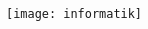 
\thispagestyle{empty}

\begin{addmargin}[-0.5cm]{0cm}
\centering
  \large

  \hfill

  \vspace{30mm}

  \oTUM{4cm}\\
  \vspace{10mm}
  \spacedallcaps{\faculty} \\
  \textsc{\university} \\ \bigskip

  \vfill

  \textit{\doctype} \\ \bigskip

  \begingroup
    \color{Maroon}\spacedallcaps{\title} \\ \bigskip
  \endgroup

  \vfill

  \spacedlowsmallcaps{\author}

  \vfill

  \texttt{[image: informatik]} \\ \medskip

\end{addmargin}
